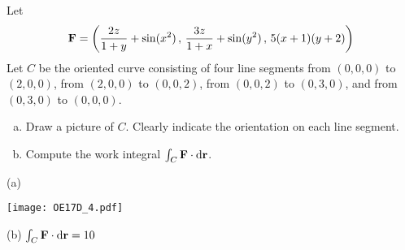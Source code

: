 \begin{question}[M317 2017D] %
Let
\begin{equation*}
\mathbf{F}=\left(\frac{2z}{1+y}+\sin(x^2)\,,\,
           \frac{3z}{1+x}+\sin(y^2)\,,\,
           5(x+1)(y+2)\right)
\end{equation*}
Let $C$ be the oriented curve consisting of four line segments 
from $(0,0,0)$ to $(2,0,0)$,
from $(2,0,0)$ to $(0,0,2)$,
from $(0,0,2)$ to $(0,3,0)$, and
from $(0,3,0)$ to $(0,0,0)$.

\begin{enumerate}[(a)]
\item
Draw a picture of $C$. Clearly indicate the orientation
on each line segment.

\item
Compute the work integral $\int_C\mathbf{F}\cdot\mathrm{d}\mathbf{r}$.
\end{enumerate}
\end{question}


\begin{answer} 
(a) 

\begin{center}
     \texttt{[image: OE17D\_4.pdf]}
\end{center}

(b) $\int_C\mathbf{F}\cdot\mathrm{d}\mathbf{r} = 10$
\end{answer}

